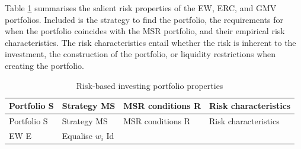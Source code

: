 \documentclass[
]{article}
\begin{document}
Table \ref{tab:rbportprops} summarises the salient risk properties of the EW, ERC, and GMV
portfolios. Included is the strategy to find the portfolio, the requirements for when the portfolio
coincides with the MSR portfolio, and their empirical risk characteristics. The risk characteristics
entail whether the risk is inherent to the investment, the construction of the portfolio, or liquidity
restrictions when creating the portfolio.

\begin{longtable}[]{@{}llll@{}}
\caption{\label{tab:rbportprops} Risk-based investing portfolio properties \citet{J13}}\tabularnewline
\toprule
\begin{minipage}[b]{0.06\columnwidth}\raggedright
Portfolio \textbar{} S\strut
\end{minipage} & \begin{minipage}[b]{0.09\columnwidth}\raggedright
Strategy \textbar{} MS\strut
\end{minipage} & \begin{minipage}[b]{0.39\columnwidth}\raggedright
MSR conditions \textbar{} R\strut
\end{minipage} & \begin{minipage}[b]{0.34\columnwidth}\raggedright
Risk characteristics \textbar{}\strut
\end{minipage}\tabularnewline
\midrule
\endfirsthead
\toprule
\begin{minipage}[b]{0.06\columnwidth}\raggedright
Portfolio \textbar{} S\strut
\end{minipage} & \begin{minipage}[b]{0.09\columnwidth}\raggedright
Strategy \textbar{} MS\strut
\end{minipage} & \begin{minipage}[b]{0.39\columnwidth}\raggedright
MSR conditions \textbar{} R\strut
\end{minipage} & \begin{minipage}[b]{0.34\columnwidth}\raggedright
Risk characteristics \textbar{}\strut
\end{minipage}\tabularnewline
\midrule
\endhead
\begin{minipage}[t]{0.06\columnwidth}\raggedright
EW \textbar{} E\strut
\end{minipage} & \begin{minipage}[t]{0.09\columnwidth}\raggedright
Equalise \(w_i\) \textbar{} Id\strut
\end{minipage} & \begin{minipage}[t]{0.39\columnwidth}\raggedright

\end{minipage}
\end{longtable}
\end{document}
